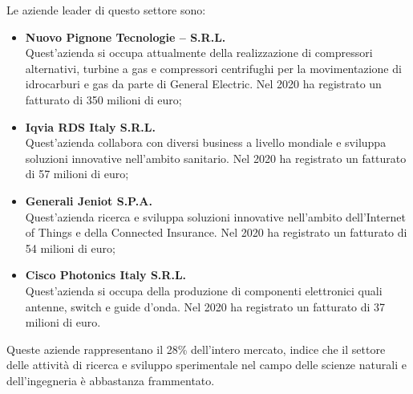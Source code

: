 Le aziende leader di questo settore sono:
\begin{itemize}
	\item \textbf{Nuovo Pignone Tecnologie – S.R.L.}\\
	Quest’azienda si occupa attualmente della realizzazione di compressori alternativi, turbine a gas e compressori centrifughi per la movimentazione di idrocarburi e gas da parte di General Electric.
	Nel 2020 ha registrato un fatturato di 350 milioni di euro;
	
	\item \textbf{Iqvia RDS Italy S.R.L.}\\
	Quest’azienda collabora con diversi business a livello mondiale e sviluppa soluzioni innovative nell’ambito sanitario.
	Nel 2020 ha registrato un fatturato di 57 milioni di euro;
	
	\item \textbf{Generali Jeniot S.P.A.}\\
	Quest’azienda ricerca e sviluppa soluzioni innovative nell’ambito dell’Internet of Things e della Connected Insurance.
	Nel 2020 ha registrato un fatturato di 54 milioni di euro;
	
	\item \textbf{Cisco Photonics Italy S.R.L.}\\
	Quest’azienda si occupa della produzione di componenti elettronici quali antenne, switch e guide d’onda.
	Nel 2020 ha registrato un fatturato di 37 milioni di euro.	
\end{itemize}

Queste aziende rappresentano il 28\% dell'intero mercato, indice che il settore delle attività di ricerca e sviluppo sperimentale nel campo delle scienze naturali e dell’ingegneria è abbastanza frammentato.

